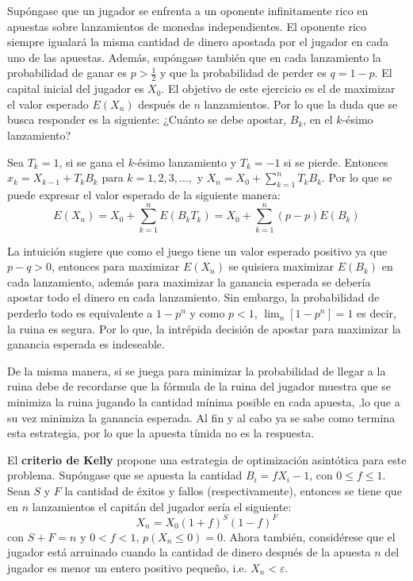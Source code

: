 Supóngase que un jugador se enfrenta a un oponente infinitamente rico en apuestas sobre lanzamientos de monedas independientes. El oponente rico siempre igualará la misma cantidad de dinero apostada por el jugador en cada uno de las apuestas. Además, supóngase también que en cada lanzamiento la probabilidad de ganar es $p>\frac{1}{2}$ y que la probabilidad de perder es $q = 1 - p$. El capital inicial del jugador es $X_0$. El objetivo de este ejercicio es el de maximizar el valor esperado $E(X_n)$ después de $n$ lanzamientos. Por lo que la duda que se busca responder es la siguiente: ¿Cuánto se debe apostar, $B_k$, en el $k$-ésimo lanzamiento?

Sea $T_k = 1$, si se gana el $k$-ésimo lanzamiento y $T_k = -1$ si se pierde. Entonces $x_k = X_{k-1} + T_k B_k$ para $k=1,2,3, ...,$ y $X_n = X_0 + \sum_{k=1}^{n}{T_k B_k}$. Por lo que se puede expresar el valor esperado de la siguiente manera:
\[E(X_n) = X_0 + \sum_{k=1}^{n}{E(B_k T_k)} = X_0 + \sum_{k=1}^{n}{(p-p)E(B_k)}\]
 
La intuición sugiere que como el juego tiene un valor esperado positivo ya que $p - q > 0$, entonces para maximizar $E(X_n)$ se quisiera maximizar $E(B_k)$ en cada lanzamiento, además para maximizar la ganancia esperada se debería apostar todo el dinero en cada lanzamiento. Sin embargo, la probabilidad de perderlo todo es equivalente a $1 - p^n$ y como $p < 1$, $\lim_n[1 - p^n] = 1$ es decir, la ruina es segura. Por lo que, la intrépida decisión de apostar para maximizar la ganancia esperada es indeseable.

De la misma manera, si se juega para minimizar la probabilidad de llegar a la ruina debe de recordarse que la fórmula de la ruina del jugador muestra que se minimiza la ruina jugando la cantidad mínima posible en cada apuesta, .lo que a su vez minimiza la ganancia esperada. Al fin y al cabo ya se sabe como termina esta estrategia, por lo que la apuesta tímida no es la respuesta.

El \textbf{criterio de Kelly} \cite{kelly1956new} propone una estrategia de optimización asintótica para este problema. Supóngase que se apuesta la cantidad $B_i = fX_i-1$, con $0 \leqslant f \leqslant 1$. Sean $S$ y $F$ la cantidad de éxitos y fallos (respectivamente), entonces se tiene que en $n$ lanzamientos el capitán del jugador sería el siguiente:
\[X_n = X_0(1+f)^S(1-f)^F\] con $S + F = n$ y $0<f<1$, $p(X_n \leqslant 0) = 0 $. 
Ahora también, considérese que el jugador está arruinado cuando la cantidad de dinero después de la apuesta $n$ del jugador es menor un entero positivo pequeño, i.e. $X_n < \varepsilon$.

